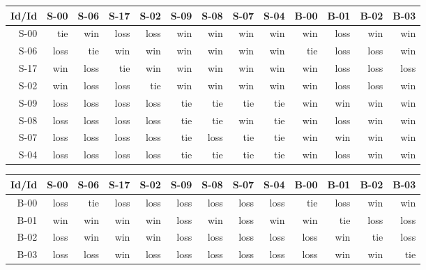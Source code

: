 \begin{tabular}{ | r | r | r | r | r | r | r | r | r | r | r | r | r | }
    \hline
        Id/Id  &   S-00  &   S-06  &   S-17  &   S-02  &   S-09  &   S-08  &   S-07  &   S-04  &   B-00  &   B-01  &   B-02  &   B-03  \\
    \hline
    \hline
         S-00  &    tie  &    win  &   loss  &   loss  &    win  &    win  &    win  &    win  &    win  &   loss  &    win  &    win  \\
    \hline
         S-06  &   loss  &    tie  &    win  &    win  &    win  &    win  &    win  &    win  &    tie  &   loss  &   loss  &    win  \\
    \hline
         S-17  &    win  &   loss  &    tie  &    win  &    win  &    win  &    win  &    win  &    win  &   loss  &   loss  &   loss  \\
    \hline
         S-02  &    win  &   loss  &   loss  &    tie  &    win  &    win  &    win  &    win  &    win  &   loss  &   loss  &    win  \\
    \hline
         S-09  &   loss  &   loss  &   loss  &   loss  &    tie  &    tie  &    tie  &    tie  &    win  &    win  &    win  &    win  \\
    \hline
         S-08  &   loss  &   loss  &   loss  &   loss  &    tie  &    tie  &    win  &    tie  &    win  &   loss  &    win  &    win  \\
    \hline
         S-07  &   loss  &   loss  &   loss  &   loss  &    tie  &   loss  &    tie  &    tie  &    win  &    win  &    win  &    win  \\
    \hline
         S-04  &   loss  &   loss  &   loss  &   loss  &    tie  &    tie  &    tie  &    tie  &    win  &   loss  &    win  &    win  \\
    \hline
\end{tabular}


\begin{tabular}{ | r | r | r | r | r | r | r | r | r | r | r | r | r | }
    \hline
        Id/Id  &   S-00  &   S-06  &   S-17  &   S-02  &   S-09  &   S-08  &   S-07  &   S-04  &   B-00  &   B-01  &   B-02  &   B-03  \\
    \hline
    \hline
         B-00  &   loss  &    tie  &   loss  &   loss  &   loss  &   loss  &   loss  &   loss  &    tie  &   loss  &    win  &    win  \\
    \hline
         B-01  &    win  &    win  &    win  &    win  &   loss  &    win  &   loss  &    win  &    win  &    tie  &   loss  &   loss  \\
    \hline
         B-02  &   loss  &    win  &    win  &    win  &   loss  &   loss  &   loss  &   loss  &   loss  &    win  &    tie  &   loss  \\
    \hline
         B-03  &   loss  &   loss  &    win  &   loss  &   loss  &   loss  &   loss  &   loss  &   loss  &    win  &    win  &    tie  \\
    \hline
\end{tabular}



